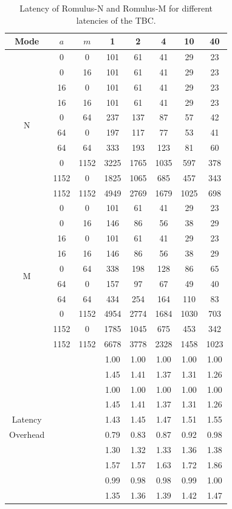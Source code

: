 \documentclass[conference]{IEEEtran}
\begin{document}
\begin{table}[!thb]
  \centering
  \caption{Latency of Romulus-N and Romulus-M for different latencies of the TBC.}\label{tab:instlatency}
  \begin{tabular}{c|c|c|c|c|c|c|c}\hline
  \textbf{Mode} & \textbf{$a$} & \textbf{$m$} & 1 & 2 & 4 & 10 & 40 \\\hline \hline
  \multirow{10}{*}{N} & 0 & 0 & 101 & 61 & 41 & 29 & 23 \\
  &  0 & 16 & 101 & 61 & 41 & 29 & 23 \\
  & 16 &  0 & 101 & 61 & 41 & 29 & 23 \\
  & 16 & 16 & 101 & 61 & 41 & 29 & 23 \\
  &  0 & 64 & 237 & 137 & 87 & 57 & 42 \\
  & 64 &  0 & 197 & 117 & 77 & 53 & 41 \\ 
  & 64 & 64 & 333 & 193 & 123 & 81 & 60 \\
  & 0 & 1152 & 3225	& 1765	& 1035	& 597	& 378 \\
  & 1152 & 0 & 1825	& 1065 &	685	& 457	& 343 \\
  & 1152 & 1152 & 4949 & 2769 & 1679	& 1025 & 698 \\ \hline

  \multirow{10}{*}{M} & 0 & 0 & 101	& 61	& 41	& 29	& 23 \\
  &  0 & 16 & 146	& 86 &	56	& 38	& 29 \\
  & 16 &  0 & 101	& 61	& 41	& 29	& 23 \\
  & 16 & 16 & 146	& 86 & 56 & 38	& 29 \\
  &  0 & 64 & 338	&198	&128	&86	&65 \\
  & 64 &  0 & 157	& 97	&67	&49	&40  \\ 
  & 64 & 64 & 434	&254	&164	&110	&83 \\
  & 0 & 1152 & 4954	&2774	&1684	&1030	&703 \\
  & 1152 & 0 & 1785	&1045	&675	&453	&342 \\
  & 1152 & 1152 & 6678	&3778	&2328	&1458	&1023 \\ \hline

  & & & 1.00	& 1.00	& 1.00	& 1.00	& 1.00 \\
  & & & 1.45	& 1.41	& 1.37	& 1.31	& 1.26 \\
  & & & 1.00	& 1.00	& 1.00	& 1.00	& 1.00 \\
  & & & 1.45	& 1.41	& 1.37	& 1.31	& 1.26 \\
  Latency& & & 1.43	& 1.45	& 1.47	& 1.51	& 1.55 \\
  Overhead& & & 0.79	& 0.83	& 0.87	& 0.92	& 0.98 \\
  & & & 1.30	& 1.32	& 1.33	& 1.36	& 1.38 \\
  & & & 1.57	& 1.57	& 1.63  & 1.72	& 1.86 \\
  & & & 0.99	& 0.98	& 0.98	& 0.99	& 1.00 \\
  & & & 1.35	& 1.36	& 1.39	& 1.42	& 1.47 \\ \hline
  \end{tabular}
\end{table}
\end{document}
